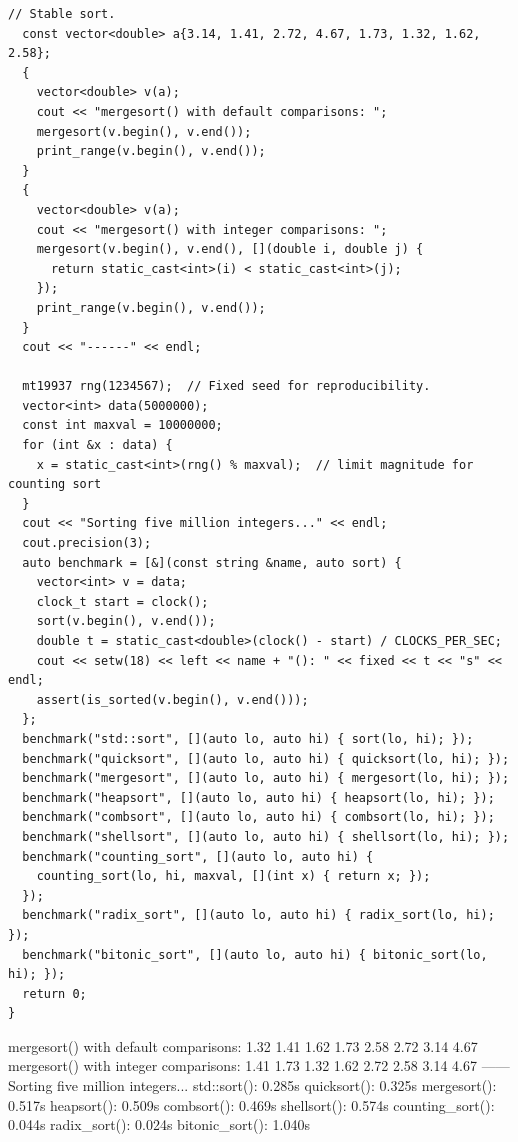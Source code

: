 \begin{lstlisting}[style=cpp]
  // Stable sort.
  const vector<double> a{3.14, 1.41, 2.72, 4.67, 1.73, 1.32, 1.62, 2.58};
  {
    vector<double> v(a);
    cout << "mergesort() with default comparisons: ";
    mergesort(v.begin(), v.end());
    print_range(v.begin(), v.end());
  }
  {
    vector<double> v(a);
    cout << "mergesort() with integer comparisons: ";
    mergesort(v.begin(), v.end(), [](double i, double j) {
      return static_cast<int>(i) < static_cast<int>(j);
    });
    print_range(v.begin(), v.end());
  }
  cout << "------" << endl;

  mt19937 rng(1234567);  // Fixed seed for reproducibility.
  vector<int> data(5000000);
  const int maxval = 10000000;
  for (int &x : data) {
    x = static_cast<int>(rng() % maxval);  // limit magnitude for counting sort
  }
  cout << "Sorting five million integers..." << endl;
  cout.precision(3);
  auto benchmark = [&](const string &name, auto sort) {
    vector<int> v = data;
    clock_t start = clock();
    sort(v.begin(), v.end());
    double t = static_cast<double>(clock() - start) / CLOCKS_PER_SEC;
    cout << setw(18) << left << name + "(): " << fixed << t << "s" << endl;
    assert(is_sorted(v.begin(), v.end()));
  };
  benchmark("std::sort", [](auto lo, auto hi) { sort(lo, hi); });
  benchmark("quicksort", [](auto lo, auto hi) { quicksort(lo, hi); });
  benchmark("mergesort", [](auto lo, auto hi) { mergesort(lo, hi); });
  benchmark("heapsort", [](auto lo, auto hi) { heapsort(lo, hi); });
  benchmark("combsort", [](auto lo, auto hi) { combsort(lo, hi); });
  benchmark("shellsort", [](auto lo, auto hi) { shellsort(lo, hi); });
  benchmark("counting_sort", [](auto lo, auto hi) {
    counting_sort(lo, hi, maxval, [](int x) { return x; });
  });
  benchmark("radix_sort", [](auto lo, auto hi) { radix_sort(lo, hi); });
  benchmark("bitonic_sort", [](auto lo, auto hi) { bitonic_sort(lo, hi); });
  return 0;
}
\end{lstlisting}
\begin{exampleoutput}
mergesort() with default comparisons: 1.32 1.41 1.62 1.73 2.58 2.72 3.14 4.67
mergesort() with integer comparisons: 1.41 1.73 1.32 1.62 2.72 2.58 3.14 4.67
------
Sorting five million integers...
std::sort():      0.285s
quicksort():      0.325s
mergesort():      0.517s
heapsort():       0.509s
combsort():       0.469s
shellsort():      0.574s
counting_sort():  0.044s
radix_sort():     0.024s
bitonic_sort():   1.040s
\end{exampleoutput}
